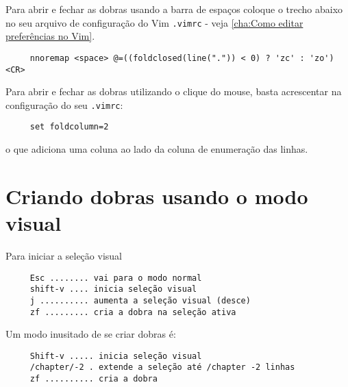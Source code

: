 Para abrir e fechar as dobras usando a barra de
espaços coloque o trecho abaixo no seu arquivo de configuração do Vim
\verb|.vimrc| - veja \ref{cha:Como editar preferências no Vim}.

\begin{verbatim}
     nnoremap <space> @=((foldclosed(line(".")) < 0) ? 'zc' : 'zo')<CR>
\end{verbatim}

Para abrir e fechar as dobras utilizando o clique do mouse, basta
acrescentar na configuração do seu \verb|.vimrc|:

\begin{verbatim}
     set foldcolumn=2
\end{verbatim}

o que adiciona uma coluna ao lado da coluna de enumeração das linhas.

\section{Criando dobras usando o modo visual}
\label{Criando folders usando o modo visual}
Para iniciar a seleção visual

\begin{verbatim}
     Esc ........ vai para o modo normal
     shift-v .... inicia seleção visual
     j .......... aumenta a seleção visual (desce)
     zf ......... cria a dobra na seleção ativa
\end{verbatim}

Um modo inusitado de se criar dobras é:

\begin{verbatim}
     Shift-v ..... inicia seleção visual
     /chapter/-2 . extende a seleção até /chapter -2 linhas
     zf .......... cria a dobra
\end{verbatim}
